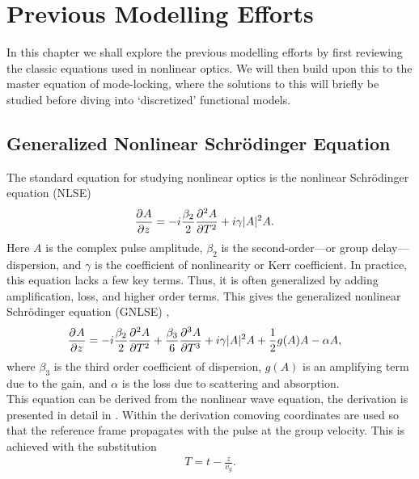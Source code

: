 
\chapter{Previous Modelling Efforts}
In this chapter we shall explore the previous modelling efforts by first reviewing the classic equations used in nonlinear optics. We will then build upon this to the master equation of mode-locking, where the solutions to this will briefly be studied before diving into `discretized' functional models. \\

\section{Generalized Nonlinear Schr\"odinger Equation}
The standard equation for studying nonlinear optics is the nonlinear Schr\"odinger equation (NLSE) \cite{agrawal2013, anderson, burgoyne2007, desurvire, ferreira, finot, rothenberg}
\begin{align*}
\pdiff{A}{z} &= - i \frac{\beta_2}{2}\pdiff[2]{A}{T} + i \gamma |A|^2 A.
\end{align*}
Here $A$ is the complex pulse amplitude, $\beta_2$ is the second-order---or group delay---dispersion, and $\gamma$ is the coefficient of nonlinearity or Kerr coefficient. In practice, this equation lacks a few key terms. Thus, it is often generalized by adding amplification, loss, and higher order terms. This gives the generalized nonlinear Schr\"odinger equation (GNLSE) \cite{agrawal2013, bohun, finot, peng, shtyrina, yarutkina},
\begin{align}
\label{eq:nlse}
\pdiff{A}{z} &= - i \frac{\beta_2}{2}\pdiff[2]{A}{T} + \frac{\beta_3}{6}\pdiff[3]{A}{T} + i \gamma |A|^2 A + \frac{1}{2}g(A) A - \alpha A,
\end{align}
where $\beta_3$ is the third order coefficient of dispersion, $g(A)$ is an amplifying term due to the gain, and $\alpha$ is the loss due to scattering and absorption. \\

This equation can be derived from the nonlinear wave equation, the derivation is presented in detail in \cite{agrawal2013, ferreira}. Within the derivation comoving coordinates are used so that the reference frame propagates with the pulse at the group velocity. This is achieved with the substitution
\begin{align*}
T = t - \frac{z}{v_g}.
\end{align*}

